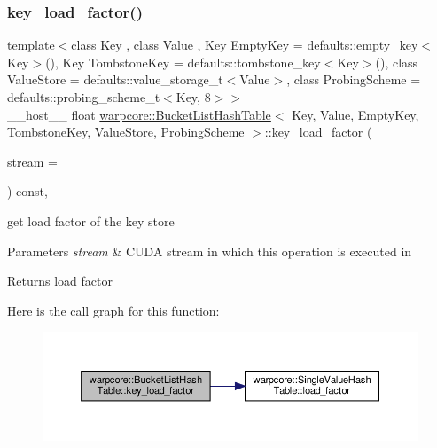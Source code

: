 \subsubsection{\texorpdfstring{key\+\_\+load\+\_\+factor()}{key\_load\_factor()}}
{\footnotesize\ttfamily template$<$class Key , class Value , Key Empty\+Key = defaults\+::empty\+\_\+key$<$\+Key$>$(), Key Tombstone\+Key = defaults\+::tombstone\+\_\+key$<$\+Key$>$(), class Value\+Store  = defaults\+::value\+\_\+storage\+\_\+t$<$\+Value$>$, class Probing\+Scheme  = defaults\+::probing\+\_\+scheme\+\_\+t$<$\+Key, 8$>$$>$ \\
\+\_\+\+\_\+host\+\_\+\+\_\+ float \hyperlink{classwarpcore_1_1BucketListHashTable}{warpcore\+::\+Bucket\+List\+Hash\+Table}$<$ Key, Value, Empty\+Key, Tombstone\+Key, Value\+Store, Probing\+Scheme $>$\+::key\+\_\+load\+\_\+factor (\begin{DoxyParamCaption}\item[{const cuda\+Stream\+\_\+t}]{stream = {} }\end{DoxyParamCaption}) const\hspace{0.3cm}{\ttfamily [inline]}, {\ttfamily [noexcept]}}



get load factor of the key store 


\begin{DoxyParams}{Parameters}
{\em stream} & C\+U\+DA stream in which this operation is executed in \\
\hline
\end{DoxyParams}
\begin{DoxyReturn}{Returns}
load factor 
\end{DoxyReturn}
Here is the call graph for this function\+:
\nopagebreak
\begin{figure}[H]
\begin{center}
\leavevmode
\includegraphics[width=350pt]{classwarpcore_1_1BucketListHashTable_ac0a51f17e2c2deaee7ad80e491b96259_cgraph}
\end{center}
\end{figure}
\mbox{\label{classwarpcore_1_1BucketListHashTable_a3b9c182c25464b5d6fa87d32f80fe281}} 

